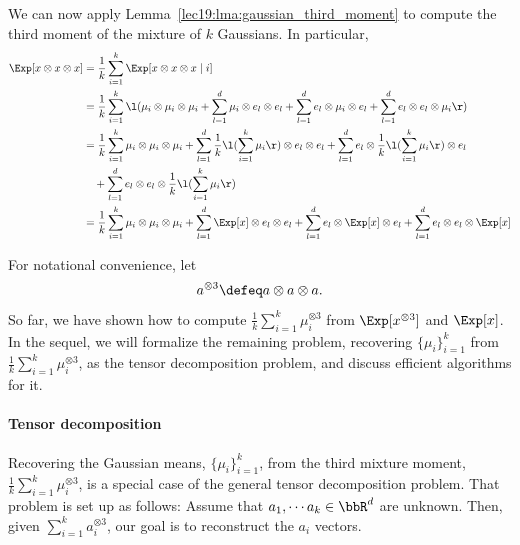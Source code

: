 We can now apply Lemma~\ref{lec19:lma:gaussian_third_moment} to compute the third moment of the mixture of $k$ Gaussians. In particular,
\begin{align}
	\Exp[x \otimes x \otimes x] & =  \frac{1}{k} \sum_{i=1}^k \Exp[x \otimes x \otimes x \mid i] \\
	&=  \frac{1}{k} \sum_{i=1}^k \l (\mu_i \otimes \mu_i \otimes \mu_i +  \sum_{l=1}^d \mu_i \otimes e_l \otimes e_l + \sum_{l=1}^d  e_l \otimes \mu_i \otimes e_l + \sum_{l=1}^d  e_l \otimes e_l \otimes \mu_i \r ) \\
	&=  \frac{1}{k} \sum_{i=1}^k \mu_i \otimes \mu_i \otimes \mu_i +  \sum_{l=1}^d \frac{1}{k} \l (\sum_{i=1}^k \mu_i \r ) \otimes e_l \otimes e_l + \sum_{l=1}^d  e_l \otimes \frac{1}{k} \l (\sum_{i=1}^k \mu_i \r ) \otimes e_l \nonumber \\
    &\quad + \sum_{l=1}^d  e_l \otimes e_l \otimes \frac{1}{k} \l (\sum_{i=1}^k \mu_i \r) \\
	& =  \frac{1}{k} \sum_{i=1}^k \mu_i \otimes \mu_i \otimes \mu_i +  \sum_{l=1}^d \Exp[x] \otimes e_l \otimes e_l + \sum_{l=1}^d  e_l \otimes \Exp[x] \otimes e_l + \sum_{l=1}^d  e_l \otimes e_l \otimes \Exp[x]\\
\end{align} 

For notational convenience, let
\begin{equation}
    a^{\otimes 3} \defeq a \otimes a \otimes a.
\end{equation} 
So far, we have shown how to compute $\frac{1}{k} \sum_{i=1}^k \mu_i^{\otimes 3}$ from $\Exp[x^{\otimes 3}]$ and $\Exp[x]$. In the sequel, we will formalize the remaining problem, recovering $\{\mu_i\}_{i = 1}^k$ from $\frac{1}{k} \sum_{i = 1}^k \mu_i^{\otimes 3}$, as the tensor decomposition problem, and discuss efficient algorithms for it.

\paragraph{Tensor decomposition}
Recovering the Gaussian means, $\{\mu_i\}_{i = 1}^k$,  from the third mixture moment, $\frac{1}{k} \sum_{i = 1}^k \mu_i^{\otimes 3}$, is a special case of the general tensor decomposition problem. That problem is set up as follows: Assume that $a_1, \cdots a_k \in \bbR^d$ are unknown. Then, given $\sum_{i=1}^k a_i^{\otimes 3}$, our goal is to reconstruct the $a_i$ vectors. 

